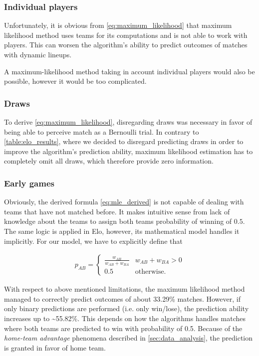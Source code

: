 \subsubsection{Individual players}
Unfortunately, it is obvious from \eqref{eq:maximum_likelihood} that maximum likelihood method uses teams for its computations and is not able to work with players. This can worsen the algorithm's ability to predict outcomes of matches with dynamic lineups.

A maximum-likelihood method taking in account individual players would also be possible, however it would be too complicated.

\subsubsection{Draws}
To derive \eqref{eq:maximum_likelihood}, disregarding draws was necessary in favor of being able to perceive match as a Bernoulli trial. In contrary to \autoref{table:elo_results}, where we decided to disregard predicting draws in order to improve the algorithm's prediction ability, maximum likelihood estimation has to completely omit all draws, which therefore provide zero information.

\subsubsection{Early games}
Obviously, the derived formula \eqref{eq:mle_derived} is not capable of dealing with teams that have not matched before. It makes intuitive sense from lack of knowledge about the teams to assign both teams probability of winning of $0.5$. The same logic is applied in Elo, however, its mathematical model handles it implicitly. For our model, we have to explicitly define that

\begin{align}
p_{AB} = 
\begin{cases}
\frac{w_{AB}}{w_{AB} + w_{BA}} & w_{AB} + w_{BA} > 0 \\
0.5 & \textrm{otherwise}.
\end{cases}
\end{align}

With respect to above mentioned limitations, the maximum likelihood method managed to correctly predict outcomes of about 33.29\% matches. However, if only binary predictions are performed (i.e. only win/lose), the prediction ability increases up to \textasciitilde 55.82\%. This depends on how the algorithms handles matches where both teams are predicted to win with probability of 0.5. Because of the \textit{home-team advantage} phenomena described in \ref{sec:data_analysis}, the prediction is granted in favor of home team.

